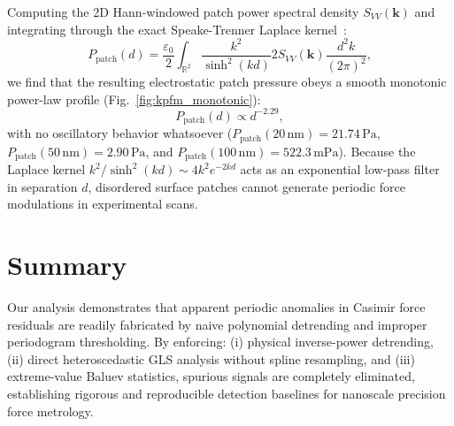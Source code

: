 Computing the 2D Hann-windowed patch power spectral density $S_{VV}(\mathbf{k})$ and integrating through the exact Speake-Trenner Laplace kernel~\cite{speake2003}:
\begin{equation}
P_{\mathrm{patch}}(d) = \frac{\varepsilon_0}{2} \int_{\mathbb{R}^2} \frac{k^2}{\sinh^2(kd)} 2 S_{VV}(\mathbf{k}) \frac{d^2k}{(2\pi)^2},
\label{eq:speake}
\end{equation}
we find that the resulting electrostatic patch pressure obeys a smooth monotonic power-law profile (Fig.~\ref{fig:kpfm_monotonic}):
\begin{equation}
P_{\mathrm{patch}}(d) \propto d^{-2.29},
\end{equation}
with no oscillatory behavior whatsoever ($P_{\mathrm{patch}}(20\,\mathrm{nm}) = 21.74\,\mathrm{Pa}$, $P_{\mathrm{patch}}(50\,\mathrm{nm}) = 2.90\,\mathrm{Pa}$, and $P_{\mathrm{patch}}(100\,\mathrm{nm}) = 522.3\,\mathrm{mPa}$). Because the Laplace kernel $k^2/\sinh^2(kd) \sim 4k^2 e^{-2kd}$ acts as an exponential low-pass filter in separation $d$, disordered surface patches cannot generate periodic force modulations in experimental scans.

\section{Summary}
Our analysis demonstrates that apparent periodic anomalies in Casimir force residuals are readily fabricated by naive polynomial detrending and improper periodogram thresholding. By enforcing: (i) physical inverse-power detrending, (ii) direct heteroscedastic GLS analysis without spline resampling, and (iii) extreme-value Baluev statistics, spurious signals are completely eliminated, establishing rigorous and reproducible detection baselines for nanoscale precision force metrology.

